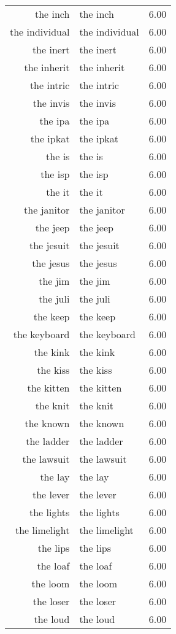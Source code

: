 \begin{table}[ht]
\begin{tabular}{rlr}
  the inch & the inch & 6.00 \\ 
  the individual & the individual & 6.00 \\ 
  the inert & the inert & 6.00 \\ 
  the inherit & the inherit & 6.00 \\ 
  the intric & the intric & 6.00 \\ 
  the invis & the invis & 6.00 \\ 
  the ipa & the ipa & 6.00 \\ 
  the ipkat & the ipkat & 6.00 \\ 
  the is & the is & 6.00 \\ 
  the isp & the isp & 6.00 \\ 
  the it & the it & 6.00 \\ 
  the janitor & the janitor & 6.00 \\ 
  the jeep & the jeep & 6.00 \\ 
  the jesuit & the jesuit & 6.00 \\ 
  the jesus & the jesus & 6.00 \\ 
  the jim & the jim & 6.00 \\ 
  the juli & the juli & 6.00 \\ 
  the keep & the keep & 6.00 \\ 
  the keyboard & the keyboard & 6.00 \\ 
  the kink & the kink & 6.00 \\ 
  the kiss & the kiss & 6.00 \\ 
  the kitten & the kitten & 6.00 \\ 
  the knit & the knit & 6.00 \\ 
  the known & the known & 6.00 \\ 
  the ladder & the ladder & 6.00 \\ 
  the lawsuit & the lawsuit & 6.00 \\ 
  the lay & the lay & 6.00 \\ 
  the lever & the lever & 6.00 \\ 
  the lights & the lights & 6.00 \\ 
  the limelight & the limelight & 6.00 \\ 
  the lips & the lips & 6.00 \\ 
  the loaf & the loaf & 6.00 \\ 
  the loom & the loom & 6.00 \\ 
  the loser & the loser & 6.00 \\ 
  the loud & the loud & 6.00 \\ 

\end{tabular}
\end{table}
